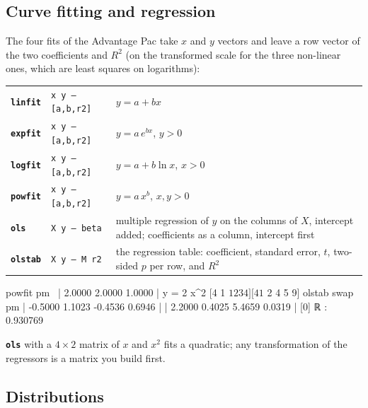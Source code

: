 \documentclass[11pt,letterpaper]{article}
\newcommand{\cmd}[1]{\texttt{\textbf{#1}}}
\newcommand{\stk}[1]{\texttt{#1}}
\begin{document}
\subsection{Curve fitting and regression}

The four fits of the Advantage Pac take $x$ and $y$ vectors and leave a row vector of the two coefficients and $R^2$ (on the transformed scale for the three non-linear ones, which are least squares on logarithms):
\begin{center}
\begin{tabular}{@{}llp{}@{}}
\toprule
\cmd{linfit} & \stk{x y -- [a,b,r2]} & $y = a + bx$ \\
\cmd{expfit} & \stk{x y -- [a,b,r2]} & $y = a\,e^{bx}$, $y > 0$ \\
\cmd{logfit} & \stk{x y -- [a,b,r2]} & $y = a + b\ln x$, $x > 0$ \\
\cmd{powfit} & \stk{x y -- [a,b,r2]} & $y = a\,x^b$, $x, y > 0$ \\
\cmd{ols}    & \stk{X y -- beta} & multiple regression of $y$ on the columns of $X$, intercept added; coefficients as a column, intercept first \\
\cmd{olstab} & \stk{X y -- M r2} & the regression table: coefficient, standard error, $t$, two-sided $p$ per row, and $R^2$ \\
\bottomrule
\end{tabular}
\end{center}
\begin{rpn}
[1 4 $ 1 2 3 4] [1 4 $ 2 8 18 32] powfit pm          \ | 2.0000 2.0000 1.0000 |   y = 2 x^2
[4 1 $ 1 2 3 4] [4 1 $ 2 4 5 9] olstab swap pm
| -0.5000 1.1023 -0.4536 0.6946 |
|  2.2000 0.4025  5.4659 0.0319 |
[0] ℝ : 0.930769
\end{rpn}
\cmd{ols} with a $4\times 2$ matrix of $x$ and $x^2$ fits a quadratic; any transformation of the regressors is a matrix you build first.

\subsection{Distributions}
\end{document}
